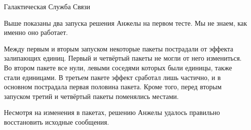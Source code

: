 \begin{problem}{Галактическая Служба Связи}
\Explanations

Выше показаны два запуска решения Анжелы на первом тесте.
Мы не знаем, как именно оно работает.

Между первым и вторым запуском некоторые пакеты
пострадали от эффекта залипающих единиц.
Первый и четвёртый пакеты не могли от него измениться.
Во втором пакете все нули, левыми соседями которых были единицы,
также стали единицами.
В третьем пакете эффект сработал лишь частично,
и в основном пострадала первая половина пакета.
Кроме того, перед вторым запуском
третий и четвёртый пакеты поменялись местами.

Несмотря на изменения в пакетах, решению Анжелы удалось
правильно восстановить исходные сообщения.

\end{problem}
